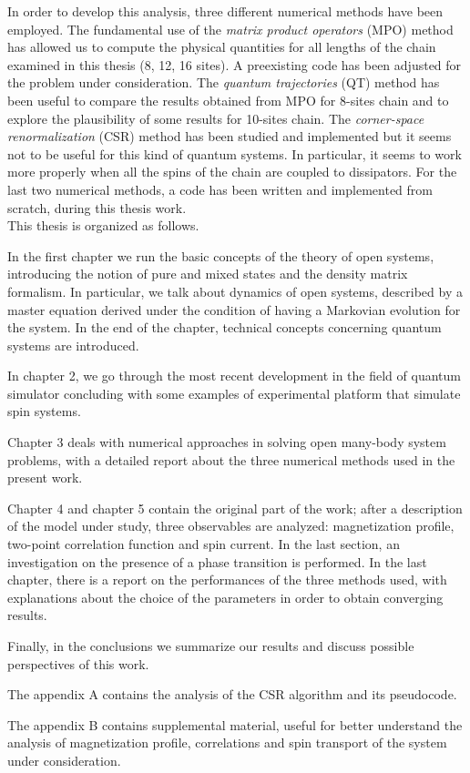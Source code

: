 In order to develop this analysis, three different numerical methods have been employed.  The fundamental use of the \emph{matrix product operators} (MPO) method has allowed us to compute the physical quantities for all lengths of the chain examined in this thesis (8, 12, 16 sites). A preexisting code has been adjusted for the problem under consideration. The \emph{quantum trajectories} (QT) method has been useful to compare the results obtained from MPO for 8-sites chain and to explore the plausibility of some results for 10-sites chain. The \emph{corner-space renormalization} (CSR) method has been studied and implemented but it seems not to be useful for this kind of quantum systems. In particular, it seems to work more properly when all the spins of the chain are coupled to dissipators. For the last two numerical methods, a code has been written and implemented from scratch, during this thesis work.
\\


This thesis is organized as follows. 

In the first chapter we run the basic concepts of the theory of open systems, introducing the notion of pure and mixed states and the density matrix formalism. In particular, we talk about dynamics of open systems, described by a master equation derived under the condition of having a Markovian evolution for the system. In the end of the chapter, technical concepts concerning quantum systems are introduced. 

In chapter 2, we go through the most recent development in the field of quantum simulator concluding with some examples of experimental platform that simulate spin systems. 

Chapter 3 deals with numerical approaches in solving open many-body system problems, with a detailed report about the three numerical methods used in the present work. 

Chapter 4 and chapter 5 contain the original part of the work; after a description of the model under study, three observables are analyzed: magnetization profile, two-point correlation function and spin current. In the last section, an investigation on the presence of a phase transition is performed. In the last chapter, there is a report on the performances of the three methods used, with explanations about the choice of the parameters in order to obtain converging results.

Finally, in the conclusions we summarize our results and discuss possible perspectives of this work.

The appendix A contains the analysis of the CSR algorithm and its pseudocode.

The appendix B contains supplemental material, useful for better understand the analysis of magnetization profile, correlations and spin transport of the system under consideration.